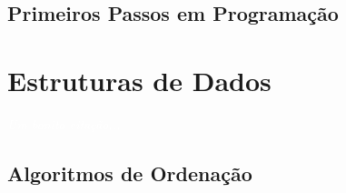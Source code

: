 \documentclass[11pt,fleqn]{book} %
\begin{document}
\newpage
\section{Primeiros Passos em Programação}\label{disc:primeirospassos}

\label{prog001}



\chapter{Estruturas de Dados}\label{estrutura}
\vspace{6em}
\begin{flushright}
	\textit{\textcolor{white}{Um bonita citação...}}
\end{flushright}
\vspace{12em}


\section{Algoritmos de Ordenação}\label{ordenacao}
\end{document}
